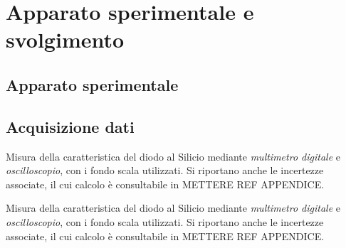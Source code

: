 \documentclass[../main.tex]{subfiles}
\begin{document}
    \section{Apparato sperimentale e svolgimento} \label{sec:acquisizione}

    \subsection{Apparato sperimentale}\label{subsec:apparato-sperimentale}

    \subsection{Acquisizione dati}\label{subsec:acquisizione-dati}

    \begin{table}[ht]
        \centering
        
        \captionsetup{justification=centering} %
        \caption{Misura della caratteristica del diodo al Silicio mediante \textit{multimetro digitale} e
        \textit{oscilloscopio}, con i fondo scala utilizzati. Si riportano anche le incertezze associate,
            il cui calcolo è consultabile in METTERE REF APPENDICE.}
        \label{tab:100uA}

    \end{table}

    \begin{table}[ht]
        \centering
        
        \captionsetup{justification=centering} %
        \caption{Misura della caratteristica del diodo al Silicio mediante \textit{multimetro digitale} e
        \textit{oscilloscopio}, con i fondo scala utilizzati. Si riportano anche le incertezze associate,
            il cui calcolo è consultabile in METTERE REF APPENDICE.}
        \label{tab:200uA}

    \end{table}
\end{document}
